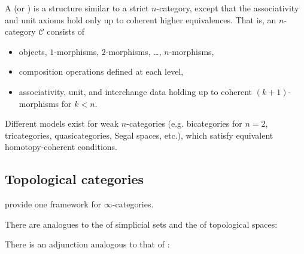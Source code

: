 \begin{definition}
A  (or ) is a structure similar to a strict $n$-category, except that the associativity and unit axioms hold only up to coherent higher equivalences.  
That is, an $n$-category $\mathcal{C}$ consists of
\begin{itemize}
  \item objects, $1$-morphisms, $2$-morphisms, …, $n$-morphisms,
  \item composition operations defined at each level,
  \item associativity, unit, and interchange data holding up to coherent $(k+1)$-morphisms for $k < n$.
\end{itemize}
Different models exist for weak $n$-categories (e.g. bicategories for $n=2$, tricategories, quasicategories, Segal spaces, etc.), which satisfy equivalent homotopy-coherent conditions.
\end{definition}





\subsection{Topological categories}

 provide one framework for $\infty$-categories.






There are analogues to the  of simplicial sets and the  of topological spaces:






There is an adjunction analogous to that of :

